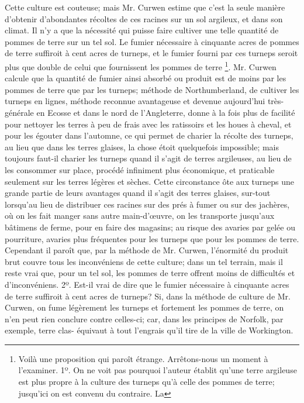 Cette culture est couteuse; mais Mr. Curwen estime que c'est la seule manière d'obtenir d'abondantes récoltes de ces racines sur un sol argileux, et dans son climat. Il n'y a que la nécessité qui puisse faire cultiver une telle quantité de pommes de terre sur un tel sol. Le fumier nécessaire à cinquante acres de pommes de terre suffiroit à cent acres de turneps, et le fumier fourni par ces turneps seroit plus que double de celui que fournissent les pommes de terre \footnote{Voilà une proposition qui paroît étrange. Arrêtons-nous un moment à l'examiner. 1º. On ne voit pas pourquoi l'auteur établit qu'une terre argileuse est plus propre à la culture des turneps qu'à celle des pommes de terre; jusqu'ici on est convenu du contraire. La}.\setcounter{page}{214} Mr. Curwen calcule que la quantité de fumier ainsi absorbé ou produit est de moins par les pommes de terre que par les turneps; méthode de Northumberland, de cultiver les turneps en lignes, méthode reconnue avantageuse et devenue aujourd'hui très-générale en Ecosse et dans le nord de l'Angleterre, donne à la fois plus de facilité pour nettoyer les terres à peu de frais avec les ratissoirs et les houes à cheval, et pour les égouter dans l'automne, ce qui permet de charier la récolte des turneps, au lieu que dans les terres glaises, la chose étoit quelquefois impossible; mais toujours faut-il charier les turneps quand il s'agit de terres argileuses, au lieu de les consommer sur place, procédé infiniment plus économique, et praticable seulement sur les terres légères et sèches. Cette circonstance ôte aux turneps une grande partie de leurs avantages quand il s'agit des terres glaises, sur-tout lorsqu'au lieu de distribuer ces racines sur des prés à fumer ou sur des jachères, où on les fait manger sans autre main-d'œuvre, on les transporte jusqu'aux bâtimens de ferme, pour en faire des magasins; au risque des avaries par gelée ou pourriture, avaries plus fréquentes pour les turneps que pour les pommes de terre. Cependant il paroît que, par la méthode de Mr. Curwen, l'énormité du produit brut couvre tous les inconvéniens de cette culture; dans un tel terrain, mais il reste vrai que, pour un tel sol, les pommes de terre offrent moins de difficultés et d'inconvéniens. 2º. Est-il vrai de dire que le fumier nécessaire à cinquante acres de terre suffiroit à cent acres de turneps? Si, dans la méthode de culture de Mr. Curwen, on fume légèrement les turneps et fortement les pommes de terre, on n'en peut rien conclure contre celles-ci; car, dans les principes de Norfolk, par exemple, terre clas-\setcounter{page}{215} équivaut à tout l'engrais qu'il tire de la ville de Workington.
